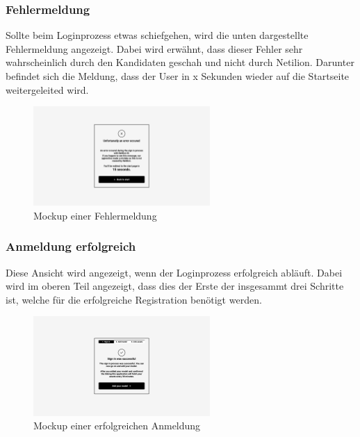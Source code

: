 \subsubsection{Fehlermeldung}
Sollte beim Loginprozess etwas schiefgehen, wird die unten dargestellte Fehlermeldung angezeigt. Dabei wird erwähnt, dass dieser Fehler sehr wahrscheinlich durch den Kandidaten geschah und nicht durch Netilion. Darunter befindet sich die Meldung, dass der User in x Sekunden wieder auf die Startseite weitergeleited wird.
\begin{figure}[H]
  \centering
  \includegraphics[angle=270,width=0.6\textwidth]{./mockups/register/error.pdf}
  \caption[{Mockup einer Fehlermeldung}]{Mockup einer Fehlermeldung}
  \label{fig:mck-error}
\end{figure}
\pagebreak
\subsubsection{Anmeldung erfolgreich}
Diese Ansicht wird angezeigt, wenn der Loginprozess erfolgreich abläuft. Dabei wird im oberen Teil angezeigt, dass dies der Erste der insgesammt drei Schritte ist, welche für die erfolgreiche Registration benötigt werden.
\begin{figure}[H]
  \centering
  \includegraphics[angle=270,width=0.6\textwidth]{./mockups/register/stage_1.pdf}
  \caption[{Mockup einer erfolgreichen Anmeldung}]{Mockup einer erfolgreichen Anmeldung}
  \label{fig:mck-stage_1}
\end{figure}
\pagebreak
